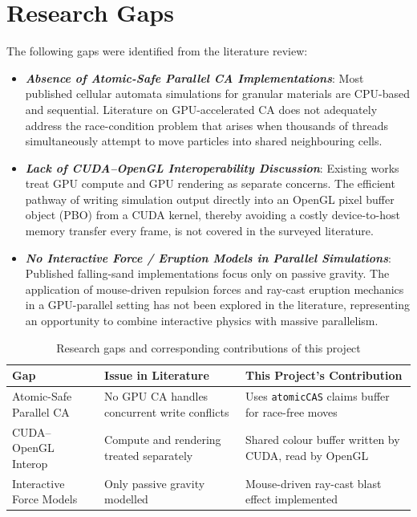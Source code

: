\documentclass[12pt,a4paper]{article}
\begin{document}
	\newpage
	\section{Research Gaps}
	The following gaps were identified from the literature review:

	\begin{itemize}
		\item \textit{\textbf{Absence of Atomic-Safe Parallel CA Implementations}}: 
        Most published cellular automata simulations for granular materials are CPU-based and sequential. 
        Literature on GPU-accelerated CA does not adequately address the race-condition problem that arises 
        when thousands of threads simultaneously attempt to move particles into shared neighbouring cells.

		\item \textit{\textbf{Lack of CUDA--OpenGL Interoperability Discussion}}: 
        Existing works treat GPU compute and GPU rendering as separate concerns. The efficient pathway 
        of writing simulation output directly into an OpenGL pixel buffer object (PBO) from a CUDA kernel, 
        thereby avoiding a costly device-to-host memory transfer every frame, is not covered in the 
        surveyed literature.

		\item \textit{\textbf{No Interactive Force / Eruption Models in Parallel Simulations}}: 
        Published falling-sand implementations focus only on passive gravity. The application of 
        mouse-driven repulsion forces and ray-cast eruption mechanics in a GPU-parallel setting 
        has not been explored in the literature, representing an opportunity to combine interactive 
        physics with massive parallelism.
	\end{itemize}

    \begin{table}[h]
    \centering
    \begin{tabular}{|p{3.5cm}|p{5cm}|p{5cm}|}
    \hline
    \textbf{Gap} & \textbf{Issue in Literature} & \textbf{This Project's Contribution} \\
    \hline
    Atomic-Safe Parallel CA & No GPU CA handles concurrent write conflicts & Uses \texttt{atomicCAS} claims buffer for race-free moves \\
    \hline
    CUDA--OpenGL Interop & Compute and rendering treated separately & Shared colour buffer written by CUDA, read by OpenGL \\
    \hline
    Interactive Force Models & Only passive gravity modelled & Mouse-driven ray-cast blast effect implemented \\
    \hline
    \end{tabular}
    \caption{Research gaps and corresponding contributions of this project}
    \label{Table:gaps}
    \end{table}
\end{document}
